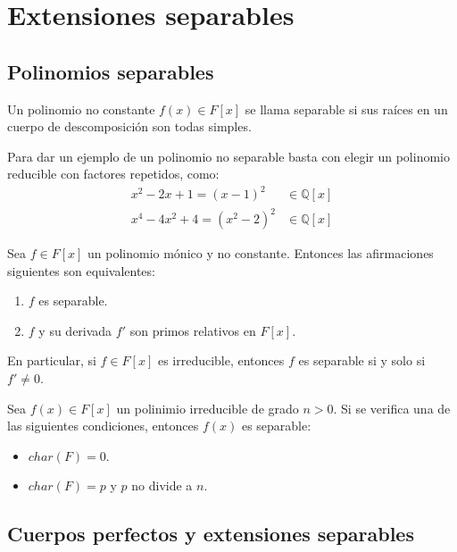 \chapter{Extensiones separables}
\section{Polinomios separables}

\begin{definition}
    Un polinomio no constante $f(x) \in F[x]$ se llama separable si sus raíces en un cuerpo de descomposición son todas simples.
\end{definition}

\begin{example}
    Para dar un ejemplo de un polinomio no separable basta con elegir un polinomio reducible con factores repetidos, como:
    \begin{align*}
        x^2-2x+1 = (x-1)^2     & \in \mathbb{Q}[x] \\
        x^4-4x^2+4 = (x^2-2)^2 & \in \mathbb{Q}[x]
    \end{align*}
\end{example}

\begin{proposition}
    Sea $f \in F[x]$ un polinomio mónico y no constante. Entonces las afirmaciones siguientes son equivalentes:
    \begin{enumerate}
        \item $f$ es separable.
        \item $f$ y su derivada $f'$ son primos relativos en $F[x]$.
    \end{enumerate}
    En particular, si $f \in F[x]$ es irreducible, entonces $f$ es separable si y solo si $f' \neq 0$.
\end{proposition}

\begin{corollary}
    Sea $f(x) \in F[x]$ un polinimio irreducible de grado $n > 0$. Si se verifica una de las siguientes condiciones, entonces $f(x)$ es separable:
    \begin{itemize}
        \item $char(F) = 0$.
        \item $char(F) = p$ y $p$ no divide a $n$.
    \end{itemize}
\end{corollary}

\section{Cuerpos perfectos y extensiones separables}

